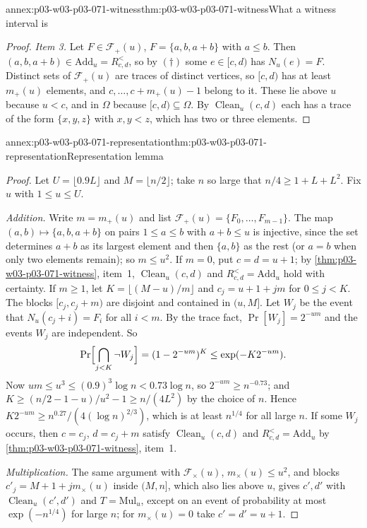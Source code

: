 \begin{annexitem}{annex:p03-w03-p03-071-witness}{thm:p03-w03-p03-071-witness}{What a witness interval is}
\begin{proof}
\emph{Item 3.}  Let \(F\in\mathcal F_+(u)\), \(F=\{a,b,a+b\}\) with
\(a\leq b\).  Then \((a,b,a+b)\in\mathrm{Add}_u=R^<_{c,d}\), so by
\((\dagger)\) some \(e\in[c,d)\) has \(N_u(e)=F\).  Distinct sets of
\(\mathcal F_+(u)\) are traces of distinct vertices, so \([c,d)\) has at
least \(m_+(u)\) elements, and \(c,\ldots,c+m_+(u)-1\) belong to it.  These
lie above \(u\) because \(u<c\), and in \(\Omega\) because \([c,d)\subseteq
\Omega\).  By \(\operatorname{Clean}_u(c,d)\) each has a trace of the form
\(\{x,y,z\}\) with \(x,y<z\), which has two or three elements.
\end{proof}
\end{annexitem}

\begin{annexitem}{annex:p03-w03-p03-071-representation}{thm:p03-w03-p03-071-representation}{Representation lemma}
\begin{proof}
Let \(U=\lfloor0.9L\rfloor\) and \(M=\lfloor n/2\rfloor\); take \(n\) so large
that \(n/4\geq1+L+L^2\).  Fix \(u\) with \(1\leq u\leq U\).

\emph{Addition.}  Write \(m=m_+(u)\) and list
\(\mathcal F_+(u)=\{F_0,\ldots,F_{m-1}\}\).  The map
\((a,b)\mapsto\{a,b,a+b\}\) on pairs \(1\leq a\leq b\) with \(a+b\leq u\) is
injective, since the set determines \(a+b\) as its largest element and then
\(\{a,b\}\) as the rest (or \(a=b\) when only two elements remain); so
\(m\leq u^2\).  If \(m=0\), put \(c=d=u+1\); by
\cref{thm:p03-w03-p03-071-witness}, item~1, \(\operatorname{Clean}_u(c,d)\)
and \(R^<_{c,d}=\mathrm{Add}_u\) hold with certainty.  If \(m\geq1\), let
\(K=\lfloor(M-u)/m\rfloor\) and \(c_j=u+1+jm\) for \(0\leq j<K\).  The blocks
\([c_j,c_j+m)\) are disjoint and contained in \((u,M]\).  Let \(W_j\) be the
event that \(N_u(c_j+i)=F_i\) for all \(i<m\).  By the trace fact,
\(\Pr[W_j]=2^{-um}\) and the events \(W_j\) are independent.  So
\[
  \Pr\Bigl[\bigcap_{j<K}\neg W_j\Bigr]=(1-2^{-um})^K\leq\exp(-K2^{-um}).
\]
Now \(um\leq u^3\leq(0.9)^3\log n<0.73\log n\), so \(2^{-um}\geq n^{-0.73}\);
and \(K\geq(n/2-1-u)/u^2-1\geq n/(4L^2)\) by the choice of \(n\).  Hence
\(K2^{-um}\geq n^{0.27}/(4(\log n)^{2/3})\), which is at least \(n^{1/4}\)
for all large \(n\).  If some \(W_j\) occurs, then \(c=c_j\), \(d=c_j+m\)
satisfy \(\operatorname{Clean}_u(c,d)\) and \(R^<_{c,d}=\mathrm{Add}_u\) by
\cref{thm:p03-w03-p03-071-witness}, item~1.

\emph{Multiplication.}  The same argument with \(\mathcal F_\times(u)\),
\(m_\times(u)\leq u^2\), and blocks \(c'_j=M+1+jm_\times(u)\) inside
\((M,n]\), which also lies above \(u\), gives \(c',d'\) with
\(\operatorname{Clean}_u(c',d')\) and \(T=\mathrm{Mul}_u\), except on an event
of probability at most \(\exp(-n^{1/4})\) for large \(n\); for
\(m_\times(u)=0\) take \(c'=d'=u+1\).


\end{proof}
\end{annexitem}
